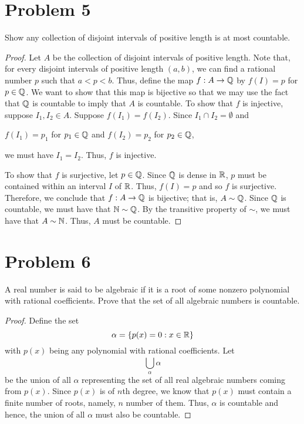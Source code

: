 \documentclass[11pt,a4paper]{article}
\begin{document}
\section*{Problem 5} Show any collection of disjoint intervals of positive length is at most countable.
\begin{proof}
    Let \( A  \) be the collection of disjoint intervals of positive length. Note that, for every disjoint intervals of positive length \( (a,b) \), we can find a rational number \( p  \) such that \( a < p < b  \). Thus, define the map \( f: A \to \mathbb{Q}  \) by \( f(I) = p  \) for \( p \in \mathbb{Q}  \). We want to show that this map is bijective so that we may use the fact that \( \mathbb{Q}  \) is countable to imply that \( A  \) is countable. To show that \( f  \) is injective, suppose \( {I}_{1}, {I}_{2} \in A  \). Suppose \( f({I}_{1}) = f({I}_{2}) \). Since \( {I}_{1} \cap {I}_{2} = \emptyset  \) and 
    \begin{center}
   \( f({I}_{1}) = {p}_{1}  \) for \( {p}_{1} \in \mathbb{Q}  \) and 
 \( f({I}_{2}) = {p}_{2} \) for \( {p}_{2} \in \mathbb{Q}  \),
    \end{center}
    we must have \( {I}_{1} = {I}_{2} \). Thus, \( f  \) is injective.

    To show that \( f  \) is surjective, let \( p \in \mathbb{Q}  \). Since \( \mathbb{Q}  \) is dense in \( \mathbb{R}  \), \( p  \) must be contained within an interval \( I \) of \( \mathbb{R}  \). Thus, \( f(I) = p  \) and so \( f \) is surjective. Therefore, we conclude that \( f: A \to \mathbb{Q}  \) is bijective; that is, \( A \sim \mathbb{Q}   \). Since \( \mathbb{Q}  \) is countable, we must have that \( \mathbb{N} \sim \mathbb{Q}  \). By the transitive property of \( \sim \), we must have that \( A \sim \mathbb{N}  \). Thus, \( A  \) must be countable.
\end{proof}

\section*{Problem 6} A real number is said to be algebraic if it is a root of some nonzero polynomial with rational coefficients. Prove that the set of all algebraic numbers is countable.
\begin{proof}
Define the set
\[  \alpha = \{ p(x) = 0 : x \in \mathbb{R}  \}  \] with \( p(x)  \) being any polynomial with rational coefficients. Let  
\[  \bigcup_{ \alpha  }^{  }  \alpha  \] be the union of all \( \alpha  \) representing the set of all real algebraic numbers coming from \( p(x) \). Since \( p(x) \) is of \( n \)th degree, we know that \( p(x) \) must contain a finite number of roots, namely, \( n  \) number of them. Thus, \( \alpha  \) is countable and hence, the union of all \( \alpha  \) must also be countable.  
\end{proof}
\end{document}
